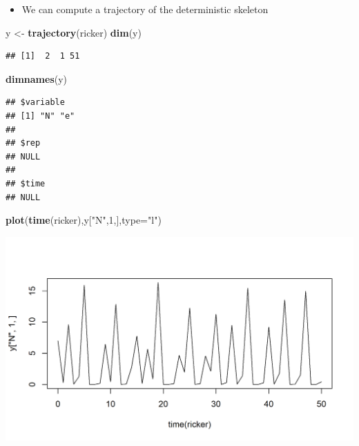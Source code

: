 \documentclass[]{article}
\newenvironment{Shaded}{\begin{snugshade}}{\end{snugshade}}
\newcommand{\KeywordTok}[1]{\textcolor[rgb]{0.13,0.29,0.53}{\textbf{#1}}}
\newcommand{\DataTypeTok}[1]{\textcolor[rgb]{0.13,0.29,0.53}{#1}}
\newcommand{\DecValTok}[1]{\textcolor[rgb]{0.00,0.00,0.81}{#1}}
\newcommand{\StringTok}[1]{\textcolor[rgb]{0.31,0.60,0.02}{#1}}
\newcommand{\NormalTok}[1]{#1}
\providecommand{\tightlist}{%
  \setlength{\itemsep}{0pt}\setlength{\parskip}{0pt}}
\begin{document}
\begin{itemize}
\tightlist
\item
  We can compute a trajectory of the deterministic skeleton
\end{itemize}

\begin{Shaded}
\begin{Highlighting}[]
\NormalTok{y <-}\StringTok{ }\KeywordTok{trajectory}\NormalTok{(ricker)}
\KeywordTok{dim}\NormalTok{(y)}
\end{Highlighting}
\end{Shaded}

\begin{verbatim}
## [1]  2  1 51
\end{verbatim}

\begin{Shaded}
\begin{Highlighting}[]
\KeywordTok{dimnames}\NormalTok{(y)}
\end{Highlighting}
\end{Shaded}

\begin{verbatim}
## $variable
## [1] "N" "e"
## 
## $rep
## NULL
## 
## $time
## NULL
\end{verbatim}

\begin{Shaded}
\begin{Highlighting}[]
\KeywordTok{plot}\NormalTok{(}\KeywordTok{time}\NormalTok{(ricker),y[}\StringTok{"N"}\NormalTok{,}\DecValTok{1}\NormalTok{,],}\DataTypeTok{type=}\StringTok{"l"}\NormalTok{)}
\end{Highlighting}
\end{Shaded}

\begin{center}\includegraphics{figure/intro-traj-ricker-1} \end{center}
\end{document}
